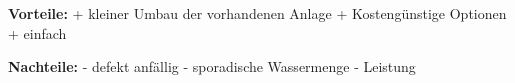 \bigskip

\textbf{Vorteile:}												\newline
+	kleiner Umbau der vorhandenen Anlage			\newline
+	Kostengünstige Optionen								\newline
+	einfach															\newline
	
\textbf{Nachteile:}												\newline
- 	defekt anfällig												\newline
-	sporadische Wassermenge							\newline
-	Leistung														\newline


